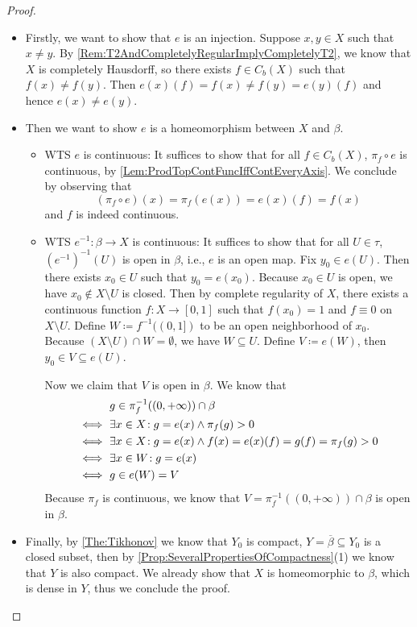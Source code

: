 \documentclass[screen,single]{techreport}
\numberwithin{equation}{section}
\begin{document}
\begin{proof}\
	\begin{itemize}
		\item Firstly, we want to show that $e$ is an injection.
		Suppose $x,y \in X$ such that $x \neq y$.
		By \cref{Rem:T2AndCompletelyRegularImplyCompletelyT2}, we know that $X$ is completely Hausdorff, so there exists $f \in C_b(X)$ such that $f(x) \neq f(y)$.
		Then $e(x)(f) = f(x) \neq f(y) = e(y)(f)$ and hence $e(x) \neq e(y)$.
		
		\item Then we want to show $e$ is a homeomorphism between $X$ and $\beta$.
		\begin{itemize}
			\item WTS $e$ is continuous: It suffices to show that for all $f \in C_b(X)$, $\pi_f \circ e$ is continuous, by \cref{Lem:ProdTopContFuncIffContEveryAxis}.
			We conclude by observing that
			\[
			(\pi_f \circ e)(x) = \pi_f(e(x)) = e(x)(f) = f(x)
			\]
			and $f$ is indeed continuous.
			\item WTS $e^{-1} : \beta \to X$ is continuous: It suffices to show that for all $U \in \tau$, $(e^{-1})^{-1}(U)$ is open in $\beta$, i.e., $e$ is an open map.
			Fix $y_0 \in e(U)$. Then there exists $x_0 \in U$ such that $y_0 = e(x_0)$.
			Because $x_0 \in U$ is open, we have $x_0 \not\in X \setminus U$ is closed.
			Then by complete regularity of $X$, there exists a continuous function $f : X \to [0,1]$ such that $f(x_0)=1$ and $f \equiv 0$ on $X \setminus U$.
			Define $W \coloneqq f^{-1}((0,1])$ to be an open neighborhood of $x_0$.
			Because $(X \setminus U) \cap W = \emptyset$, we have $W \subseteq U$.
			Define $V \coloneqq e(W)$, then $y_0 \in V \subseteq e(U)$.
			
			Now we claim that $V$ is open in $\beta$. We know that
			\begin{align*}
				& g \in \pi_f^{-1}((0,+\infty)) \cap \beta \\
				\iff~ & \exists {x \in X}\!: g = e(x) \wedge \pi_f(g) > 0 \\
				\iff~ & \exists {x \in X }\!: g=e(x) \wedge f(x)=e(x)(f)=g(f) = \pi_f(g) > 0 \\
				\iff~& \exists {x \in W}\!: g = e(x) \\
				\iff~ & g \in e(W) = V 
			\end{align*}
			Because $\pi_f$ is continuous, we know that $V = \pi^{-1}_f((0,+\infty)) \cap \beta$ is open in $\beta$.
		\end{itemize}
		
		\item Finally, by \cref{The:Tikhonov} we know that $Y_0$ is compact, $Y = \overline{\beta} \subseteq Y_0$ is a closed subset, then by \cref{Prop:SeveralPropertiesOfCompactness}(1) we know that $Y$ is also compact.
		We already show that $X$ is homeomorphic to $\beta$, which is dense in $Y$, thus we conclude the proof.
	\end{itemize}
\end{proof}
\end{document}
